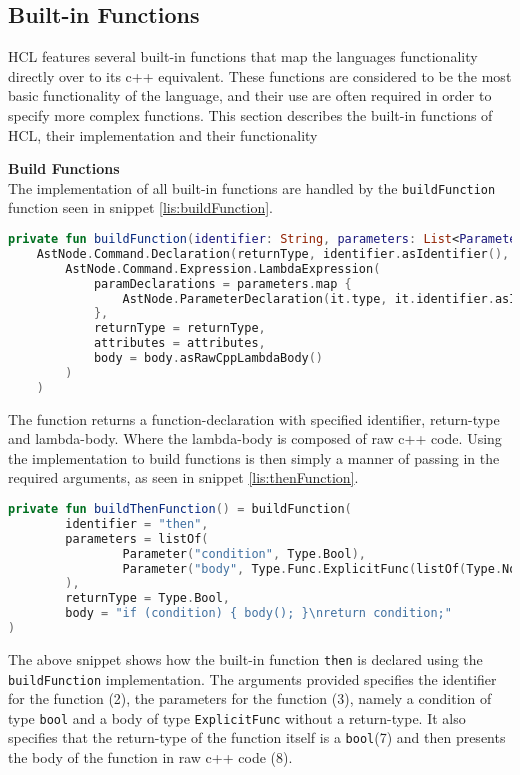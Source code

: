 \subsection{Built-in Functions}
HCL features several built-in functions that map the languages functionality directly over to its c++ equivalent. 
These functions are considered to be the most basic functionality of the language, and their use are often required in order to specify more complex functions. 
This section describes the built-in functions of HCL, their implementation and their functionality

\textbf{Build Functions}\\
The implementation of all built-in functions are handled by the \texttt{buildFunction} function seen in snippet \ref{lis:buildFunction}.

\begin{lstlisting}[language=Kotlin,label=lis:buildFunction,caption=The implementation of buildFunction.]
private fun buildFunction(identifier: String, parameters: List<Parameter>, returnType: Type, body: String, attributes: LambdaExpressionAttributes = BuiltinLambdaAttributes) =
    AstNode.Command.Declaration(returnType, identifier.asIdentifier(),
	    AstNode.Command.Expression.LambdaExpression(
            paramDeclarations = parameters.map {
                AstNode.ParameterDeclaration(it.type, it.identifier.asIdentifier())
            },
            returnType = returnType,
            attributes = attributes,
            body = body.asRawCppLambdaBody()
        )
    )
\end{lstlisting}
The function returns a function-declaration with specified identifier, return-type and lambda-body.
Where the lambda-body is composed of raw c++ code. 
Using the implementation to build functions is then simply a manner of passing in the required arguments, as seen in snippet \ref{lis:thenFunction}.

\begin{lstlisting}[language=Kotlin,label=lis:thenFunction,caption=built-in 'then' function implemented using \texttt{buildFunction}.]
private fun buildThenFunction() = buildFunction(
        identifier = "then",
        parameters = listOf(
                Parameter("condition", Type.Bool),
                Parameter("body", Type.Func.ExplicitFunc(listOf(Type.None))
        ),
        returnType = Type.Bool,
        body = "if (condition) { body(); }\nreturn condition;"
)
\end{lstlisting}
The above snippet shows how the built-in function \texttt{then} is declared using the \texttt{buildFunction} implementation. 
The arguments provided specifies the identifier for the function (2), the parameters for the function (3), namely a condition of type \texttt{bool} and a body of type \texttt{ExplicitFunc} without a return-type.
It also specifies that the return-type of the function itself is a \texttt{bool}(7) and then presents the body of the function in raw c++ code (8). 

